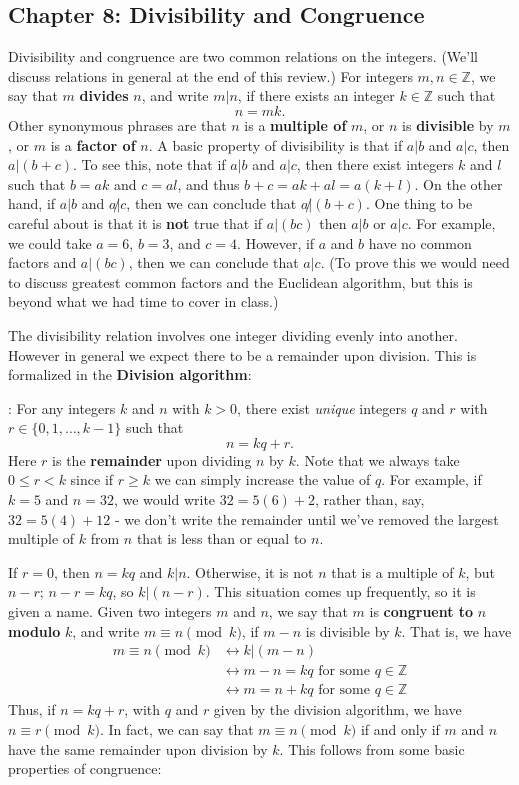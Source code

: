 \documentclass[letterpaper,12pt]{article}
\newcommand{\Z}{\mathbb{Z}}
\newcommand{\modd}[3]{#1\equiv #2 \pmod{#3}}
\begin{document}
\subsection*{Chapter 8: Divisibility and Congruence}
Divisibility and congruence are two common relations on the integers. (We'll discuss relations in general at the end of this review.) For integers $m,n\in\Z$, we say that $m$ {\bf divides} $n$, and write $m|n$, if there exists an integer $k\in\Z$ such that 
\[
 n = mk.
\]
Other synonymous phrases are that $n$ is a {\bf multiple of} $m$, or $n$ is {\bf divisible} by $m$, or $m$ is a {\bf factor of} $n$. A basic property of divisibility is that if $a|b$ and $a|c$, then $a|(b+c)$. To see this, note that if $a|b$ and $a|c$, then there exist integers $k$ and $l$ such that $b=ak$ and $c=al$, and thus $b+c = ak+al = a(k+l)$. On the other hand, if $a|b$ and $a\not| c$, then we can conclude that $a\not|(b+c)$. One thing to be careful about is that it is {\bf not} true that if $a|(bc)$ then $a|b$ or $a|c$. For example, we could take $a=6$, $b=3$, and $c=4$. However, if $a$ and $b$ have no common factors and $a|(bc)$, then we can conclude that $a|c$. (To prove this we would need to discuss greatest common factors and the Euclidean algorithm, but this is beyond what we had time to cover in class.)

The divisibility relation involves one integer dividing evenly into another. However in general we expect there to be a remainder upon division. This is formalized in the {\bf Division algorithm}:

: For any integers $k$ and $n$ with $k>0$, there exist {\em unique} integers $q$ and $r$ with $r\in \{0,1,\ldots, k-1\}$ such that
\[
 n = kq + r.
\]
Here $r$ is the {\bf remainder} upon dividing $n$ by $k$. Note that we always take $0\leq r<k$ since if $r\geq k$ we can simply increase the value of $q$. For example, if $k=5$ and $n=32$, we would write $32 = 5(6)+2$, rather than, say, $32 = 5(4)+12$ - we don't write the remainder until we've removed the largest multiple of $k$ from $n$ that is less than or equal to $n$.

If $r=0$, then $n=kq$ and $k|n$. Otherwise, it is not $n$ that is a multiple of $k$, but $n-r$; $n-r = kq$, so $k|(n-r)$. This situation comes up frequently, so it is given a name. Given two integers $m$ and $n$, we say that $m$ is {\bf congruent to} $n$ {\bf modulo} $k$, and write $\modd{m}{n}{k}$, if $m-n$ is divisible by $k$. That is, we have
\begin{align*}
 \modd{m}{n}{k} &\leftrightarrow k|(m-n)\\
&\leftrightarrow m-n = kq \text{ for some } q\in\Z\\
&\leftrightarrow m=n+kq \text{ for some } q\in \Z
\end{align*}
Thus, if $n=kq+r$, with $q$ and $r$ given by the division algorithm, we have $\modd{n}{r}{k}$. In fact, we can say that $\modd{m}{n}{k}$ if and only if $m$ and $n$ have the same remainder upon division by $k$. This follows from some basic properties of congruence:
\end{document}
